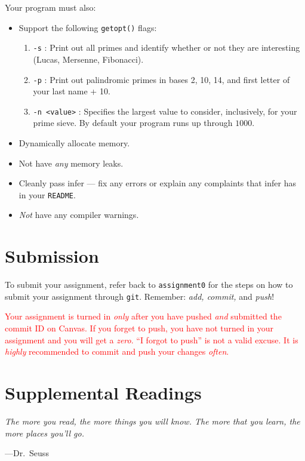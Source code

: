 \documentclass[11pt,twocolumn]{article}
\begin{document}
\noindent Your program must also:
\begin{itemize}
    \item Support the following \texttt{getopt()} flags:
        \begin{enumerate}
            \item \texttt{-s} : Print out all primes and identify whether or not
                they are interesting (Lucas, Mersenne, Fibonacci).
            \item \texttt{-p} : Print out palindromic primes in bases 2, 10,
                14, and first letter of your last name + 10.
            \item \texttt{-n <value>} : Specifies the largest value to consider,
                inclusively, for your prime sieve. By default your program runs
                up through $1000$.
        \end{enumerate}


    \item Dynamically allocate memory.
    \item Not have \emph{any} memory leaks.
    \item Cleanly pass infer --- fix any errors or explain any complaints that
        infer has in your \texttt{README}.
    \item \emph{Not} have any compiler warnings.
\end{itemize}


\section{Submission}

To submit your assignment, refer back to \texttt{assignment0} for the steps on
how to submit your assignment through \texttt{git}. Remember: \emph{add,
commit,} and \emph{push}!

\textcolor{red}{Your assignment is turned in \emph{only} after you have pushed
\emph{and} submitted the commit ID on Canvas.  If you forget to push, you have
not turned in your assignment and you will get a \emph{zero}. ``I forgot to
push'' is not a valid excuse. It is \emph{highly} recommended to commit and push
your changes \emph{often}.}

\section{Supplemental Readings}
\epigraph{\emph{The more you read, the more things you will know. The
more that you learn, the more places you'll go.}}{---Dr.\ Seuss}\noindent
\end{document}
